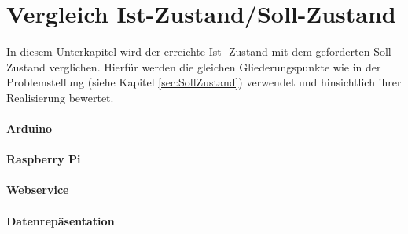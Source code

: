 \section{Vergleich Ist-Zustand/Soll-Zustand}
In diesem Unterkapitel wird der erreichte Ist- Zustand mit dem geforderten Soll-Zustand verglichen. Hierfür werden die gleichen Gliederungspunkte wie in der Problemstellung (siehe Kapitel \ref{sec:SollZustand}) verwendet und hinsichtlich ihrer Realisierung bewertet.
\paragraph{Arduino}
\paragraph{Raspberry Pi}
\paragraph{Webservice}
\paragraph{Datenrepäsentation}


